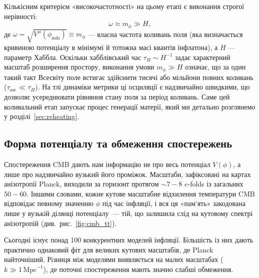 \documentclass[12pt, a4paper]{article}
\begin{document}
Кількісним критерієм «високочастотності» на цьому етапі є виконання строгої нерівності:
\begin{equation*}
    \omega \approx m_\phi \gg H,
\end{equation*}
де $\omega = \sqrt{V''(\phi_{\mathrm{min}})} \equiv m_\phi$ --- власна частота коливань поля (яка визначається кривиною потенціалу в мінімумі й тотожна масі квантів інфлатона), а $H$ --- параметр Хаббла. Оскільки хабблівський час $\tau_H \sim H^{-1}$ задає характерний масштаб розширення простору, виконання умови $m_\phi \gg H$ означає, що за один такий такт Всесвіту поле встигає здійснити тисячі або мільйони повних коливань ($\tau_{\mathrm{osc}} \ll \tau_H$). На тлі динаміки метрики ці осциляції є надзвичайно швидкими, що дозволяє усереднювати рівняння стану поля за період коливань. Саме цей коливальний етап запускає процес генерації матерії, який ми детально розглянемо у розділі~\ref{sec:reheating}.

\subsection{Форма потенціалу та обмеження спостережень}

Спостереження CMB дають нам інформацію не про весь потенціал
$V(\phi)$, а лише про надзвичайно вузький його проміжок. Масштаби,
зафіксовані на картах анізотропії Planck, виходили за горизонт
протягом $\sim\!7 - 8$ $e$-folds із загальних $50 - 60$. Іншими
словами, кожне кутове масштабне відхилення температури CMB
відповідає певному значенню $\phi$ під час інфляції, і вся ця
«пам'ять» закодована лише у вузькій ділянці потенціалу~---
тій, що залишила слід на кутовому спектрі анізотропій
(див.\ рис.~\ref{fig:cmb_tt}).


Сьогодні існує понад 100 конкурентних моделей інфляції.
Більшість із них дають практично однаковий фіт для великих
кутових масштабів, де Planck найточніший. Різниця між
моделями виявляється на малих масштабах
($k \gg 1\,\mathrm{Mpc}^{-1}$), де поточні спостереження
мають значно слабші обмеження.
\end{document}

